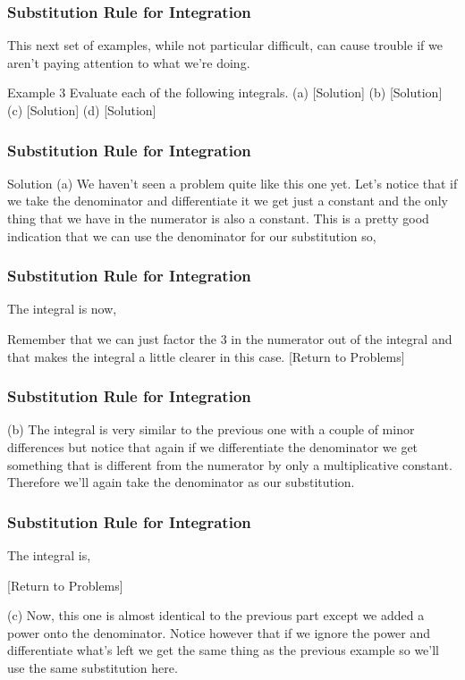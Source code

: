 \documentclass{beamer}
\begin{document}
\begin{frame}
	\frametitle{Substitution Rule for Integration}
	\large
This next set of examples, while not particular difficult, can cause trouble if we aren’t paying attention to what we’re doing.
 
Example 3  Evaluate each of the following integrals.
(a)    [Solution]
(b)    [Solution]
(c)    [Solution]
(d)    [Solution]
\end{frame}
\begin{frame}
	\frametitle{Substitution Rule for Integration}
	\large
Solution
(a) 
We haven’t seen a problem quite like this one yet.  Let’s notice that if we take the denominator and differentiate it we get just a constant and the only thing that we have in the numerator is also a constant.  This is a pretty good indication that we can use the denominator for our substitution so,
\end{frame}
\begin{frame}
	\frametitle{Substitution Rule for Integration}
	\large                         
The integral is now,
                                                 
 
Remember that we can just factor the 3 in the numerator out of the integral and that makes the integral a little clearer in this case.
 [Return to Problems]
\end{frame}
\begin{frame}
	\frametitle{Substitution Rule for Integration}
	\large
(b) 
The integral is very similar to the previous one with a couple of minor differences but notice that again if we differentiate the denominator we get something that is different from the numerator by only a multiplicative constant.  Therefore we’ll again take the denominator as our substitution.
                        
 \end{frame}
 \begin{frame}
 	\frametitle{Substitution Rule for Integration}
 	\large
The integral is,
                                               
[Return to Problems]
 
(c) 
Now, this one is almost identical to the previous part except we added a power onto the denominator.  Notice however that if we ignore the power and differentiate what’s left we get the same thing as the previous example so we’ll use the same substitution here.
                       
\end{frame}
\end{document}
